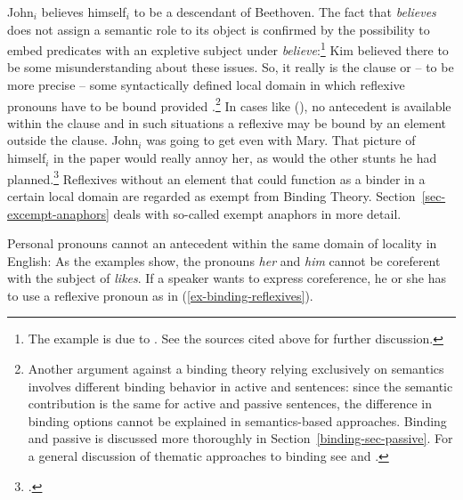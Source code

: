 \documentclass[output=paper
 	        ,biblatex
                ,babelshorthands
                ,newtxmath
                ,draftmode
                ,colorlinks, citecolor=brown
]{langscibook}
\begin{document}
\ea
John$_i$ believes himself$_i$ to be a descendant of Beethoven.
\z
The fact that \emph{believes} does not assign a semantic role to its object is confirmed by the
possibility to embed predicates with an expletive subject under \emph{believe}:\footnote{%
The example is due to \citet[]{ps2}. See the sources cited above for further discussion.
}
\ea
Kim believed there to be some misunderstanding about these issues.
\z
So, it really is the clause or -- to be more precise -- some syntactically defined local domain in
which reflexive pronouns have to be bound provided .\footnote{%
Another argument against a binding theory relying exclusively on semantics involves different binding
behavior in active and  sentences: since the semantic contribution is the same for active
and passive sentences, the difference in binding options cannot be explained in semantics-based
approaches. Binding and passive is discussed more thoroughly in Section~\ref{binding-sec-passive}. 
For a general discussion of
thematic approaches to binding see  and .
}
In cases like (), no antecedent is available within the clause and in such situations a
reflexive may be bound by an element outside the clause.
\eanoraggedright
\label{ex-stunts}
John$_i$ was going to get even with Mary. That picture of himself$_i$
in the paper would really annoy her, as would the other stunts he had planned.\footnote{
        .
}
\z
Reflexives without an element that could function as a binder in a certain local domain are regarded
as exempt from Binding Theory. Section~\ref{sec-excempt-anaphors} deals with so-called exempt anaphors in more detail.

Personal pronouns cannot  an antecedent within the same domain of locality in English:
\eal
{}
\zl
As the examples show, the pronouns \emph{her} and \emph{him} cannot be coreferent with the subject
of \emph{likes}. If a speaker wants to express coreference, he or she has to use a reflexive pronoun
as in (\ref{ex-binding-reflexives}). 
\end{document}
